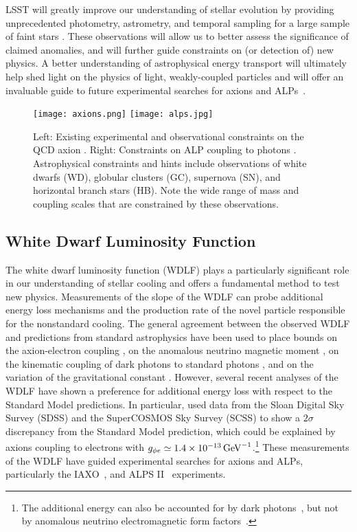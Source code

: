 LSST will greatly improve our understanding of stellar evolution by providing unprecedented photometry, astrometry, and temporal sampling for a large sample of faint stars \citep{0912.0201}.
These observations will allow us to better assess the significance of claimed anomalies, and will further guide constraints on (or detection of) new physics.
A better understanding of astrophysical energy transport will ultimately help shed light on the physics of light, weakly-coupled particles and will offer an invaluable guide to future experimental searches for axions and ALPs~\citep{Irastorza:2018dyq}.

\begin{figure}[t]
\centering
\texttt{[image: axions.png]}
\texttt{[image: alps.jpg]}
\caption{Left: Existing experimental and observational constraints on the QCD axion \citep{Redino:2015}.  
Right: Constraints on ALP coupling to photons \citep{Ringwald:2012}.
Astrophysical constraints and hints include observations of white dwarfs (WD), globular clusters (GC), supernova (SN), and horizontal branch stars (HB).
Note the wide range of mass and coupling scales that are constrained by these observations.
\label{fig:axions}
}
\end{figure}

\subsection{White Dwarf Luminosity Function}

The white dwarf luminosity function (WDLF) plays a particularly significant role in our understanding of stellar cooling and offers a fundamental method to test new physics.
Measurements of the slope of the WDLF can probe additional energy loss mechanisms and the production rate of the novel particle responsible for the nonstandard cooling.
The general agreement between the observed WDLF and predictions from standard astrophysics have been used to place bounds on the axion-electron coupling \citep{Isern:2008nt,Bertolami:2014wua}, on the anomalous neutrino magnetic moment \citep{Bertolami:2014noa}, on the kinematic coupling of dark photons to standard photons \citep{Chang:2016qfl}, and on the variation of the gravitational constant \citep{Althaus:2011ca}.
However, several recent analyses of the WDLF have shown a preference for additional energy loss with respect to the Standard Model predictions.
In particular, \cite{Bertolami:2014wua} used data from the Sloan Digital Sky Survey (SDSS) and the SuperCOSMOS Sky Survey (SCSS) to show a $2 \sigma$ discrepancy from the Standard Model prediction, which could be explained by axions coupling to electrons with $g_{\phi e}\simeq 1.4\times 10^{-13} \mathrm{\,GeV}^{-1}$.\footnote{The additional energy can also be accounted for by dark photons~\citep{Giannotti:2015kwo,Chang:2016qfl}, but not by anomalous neutrino electromagnetic form factors~\citep{Bertolami:2014noa}.}
These measurements of the WDLF have guided experimental searches for axions and ALPs, particularly the IAXO~\citep{Irastorza:2011gs,Armengaud:2014gea}, and ALPS II~\citep{Bahre:2013ywa,ALPSII} experiments.

